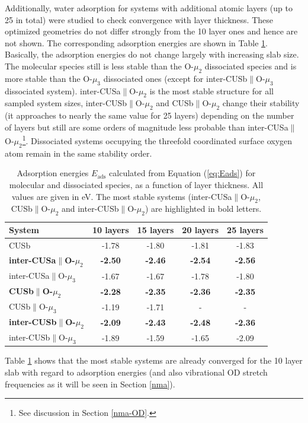 \documentclass[11pt,DIV=13,BCOR=5mm,a4paper,headinclude]{scrbook}
\begin{document}
Additionally, water adsorption for systems with additional atomic layers (up to 25 in total) were studied to check convergence with layer thickness.
These optimized geometries do not differ strongly from the 10 layer ones and hence are not shown.
The corresponding adsorption energies are shown in Table \ref{tab:eads_layers}.
Basically, the adsorption energies do not change largely with increasing slab size.
The molecular species still is less stable than the O-$\mu_2$ dissociated species and is more stable than the O-$\mu_3$ dissociated ones (except for inter-CUSb$\parallel$O-$\mu_3$ dissociated system).
inter-CUSa$\parallel$O-$\mu_2$ is the most stable structure for all sampled system sizes, inter-CUSb$\parallel$O-$\mu_2$ and CUSb$\parallel$O-$\mu_2$ change their stability (it approaches to nearly the same value for 25 layers) depending on the number of layers but still are some orders of magnitude less probable than inter-CUSa$\parallel$O-$\mu_2$\footnote{See discussion in Section \ref{nma-OD}.}.
Dissociated systems occupying the threefold coordinated surface oxygen atom remain in the same stability order.
\begin{table}[!ht]
  \centering
  \caption{Adsorption energies $E_\textrm{ads}$ calculated from Equation (\ref{eq:Eads}) for molecular and dissociated species, as a function of layer thickness.
All values are given in eV.
The most stable systems (inter-CUSa$\parallel$O-$\mu_2$, CUSb$\parallel$O-$\mu_2$ and inter-CUSb$\parallel$O-$\mu_2$) are highlighted in bold letters.}
 \begin{tabular}{l|cccc}
 \toprule
 System                     & 10 layers& 15 layers& 20 layers& 25 layers \\\midrule
CUSb                                    &-1.78 &-1.80     &-1.81     &-1.83      \\\hline
\textbf{inter-CUSa$\parallel$O-$\mu_2$}    &\textbf{-2.50} &\textbf{-2.46} &\textbf{-2.54} &\textbf{-2.56}  \\
inter-CUSa$\parallel$O-$\mu_3$          &-1.67 &-1.67 &-1.78 &-1.80 \\
\textbf{CUSb$\parallel$O-$\mu_2$}          &\textbf{-2.28} &\textbf{-2.35} &\textbf{-2.36} &\textbf{-2.35} \\
CUSb$\parallel$O-$\mu_3$                &-1.19 &-1.71 &-     &-      \\
\textbf{inter-CUSb$\parallel$O-$\mu_2$}    &\textbf{-2.09} &\textbf{-2.43} &\textbf{-2.48} &\textbf{-2.36}  \\
inter-CUSb$\parallel$O-$\mu_3$          &-1.89 &-1.59 &-1.65 &-2.09 \\\bottomrule
\end{tabular}
\label{tab:eads_layers}
\end{table}
Table \ref{tab:eads_layers} shows that the most stable systems are already converged for the 10 layer slab with regard to adsorption energies (and also vibrational OD stretch frequencies as it will be seen in Section \ref{nma}).
\end{document}
